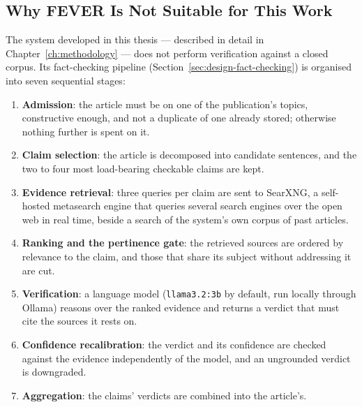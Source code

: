 
\subsection{Why FEVER Is Not Suitable for This Work}
\label{subsec:discard-justification}

The system developed in this thesis --- described in detail in
Chapter~\ref{ch:methodology} --- does not perform verification
against a closed corpus. Its fact-checking pipeline
(Section~\ref{sec:design-fact-checking}) is organised into seven
sequential stages:

\begin{enumerate}
    \item \textbf{Admission}: the article must be on one of the
    publication's topics, constructive enough, and not a duplicate of
    one already stored; otherwise nothing further is spent on it.
    \item \textbf{Claim selection}: the article is decomposed into
    candidate sentences, and the two to four most load-bearing
    checkable claims are kept.
    \item \textbf{Evidence retrieval}: three queries per claim are sent
    to SearXNG, a self-hosted metasearch engine that queries several
    search engines over the open web in real time, beside a search of
    the system's own corpus of past articles.
    \item \textbf{Ranking and the pertinence gate}: the retrieved
    sources are ordered by relevance to the claim, and those that
    share its subject without addressing it are cut.
    \item \textbf{Verification}: a language model
    (\texttt{llama3.2:3b} by default, run locally through Ollama)
    reasons over the ranked evidence and returns a verdict that must
    cite the sources it rests on.
    \item \textbf{Confidence recalibration}: the verdict and its
    confidence are checked against the evidence independently of the
    model, and an ungrounded verdict is downgraded.
    \item \textbf{Aggregation}: the claims' verdicts are combined into
    the article's.
\end{enumerate}

